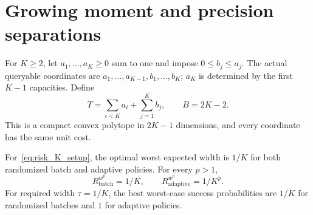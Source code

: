 \section{Growing moment and precision separations}
\label{sec:risk_growing}
For $K\ge2$, let $a_1,\ldots,a_K\ge0$ sum to one and impose
$0\le b_j\le a_j$. The actual queryable coordinates are
$a_1,\ldots,a_{K-1},b_1,\ldots,b_K$; $a_K$ is determined by the
first $K-1$ capacities. Define
\begin{equation}
 T=\sum_{i<K}a_i+\sum_{j=1}^K b_j,\qquad B=2K-2.
 \label{eq:risk_K_setup}
\end{equation}
This is a compact convex polytope in $2K-1$ dimensions, and every
coordinate has the same unit cost.

\begin{proposition}
\label{prop:risk_K_family}
For~\eqref{eq:risk_K_setup}, the optimal worst expected width is $1/K$
for both randomized batch and adaptive policies. For every $p>1$,
\begin{equation}
 R_{\mathrm{batch}}^{w^p}=1/K,\qquad
 R_{\mathrm{adaptive}}^{w^p}=1/K^p.
 \label{eq:risk_K_moments}
\end{equation}
For required width $\tau=1/K$, the best worst-case success probabilities
are $1/K$ for randomized batches and $1$ for adaptive policies.
\end{proposition}
